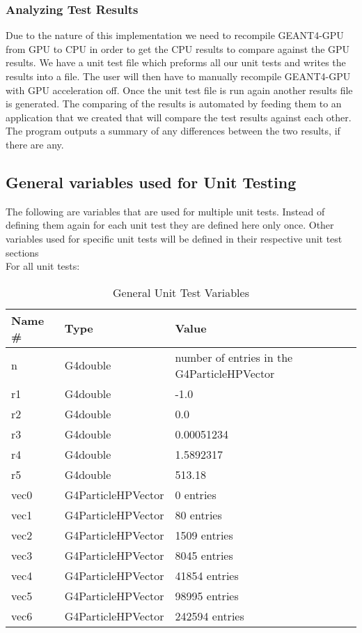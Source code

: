 \documentclass[12pt]{article}
\begin{document}
\subsubsection{Analyzing Test Results}
Due to the nature of this implementation we need to recompile GEANT4-GPU from GPU to CPU in order to get the CPU results to compare against the GPU results. We have a unit test file which preforms all our unit tests and writes the results into a file. The user will then have to manually recompile GEANT4-GPU with GPU acceleration off. Once the unit test file is run again another results file is generated. The comparing of the results is automated by feeding them to an application that we created that will compare the test results against each other. The program outputs a summary of any differences between the two results, if there are any.
\subsection{General variables used for Unit Testing}
The following are variables that are used for multiple unit tests. Instead of defining them again for each unit test they are defined here only once. Other variables used for specific unit tests will be defined in their respective unit test sections\\
For all unit tests:
\begin{table}[H]
\centering
\caption{General Unit Test Variables}\label{gen_var_table}
\begin{tabular}{lll}
\toprule
	\bf Name \# & Type & \bf Value\\\midrule
	n 	& G4double 			& number of entries in the G4ParticleHPVector\\
	r1 	& G4double 			& -1.0\\
	r2	& G4double			& 0.0\\
	r3 	& G4double 			& 0.00051234\\
	r4 	& G4double 			& 1.5892317\\
	r5 	& G4double 			& 513.18\\
	vec0 & G4ParticleHPVector 	& 0 entries\\
	vec1 & G4ParticleHPVector	& 80 entries\\
	vec2 & G4ParticleHPVector 	& 1509 entries\\
	vec3 & G4ParticleHPVector 	& 8045 entries\\
	vec4 & G4ParticleHPVector 	& 41854 entries\\
	vec5 & G4ParticleHPVector 	& 98995 entries\\
	vec6 & G4ParticleHPVector 	& 242594 entries\\
\bottomrule		
\end{tabular}
\end{table}
\end{document}
